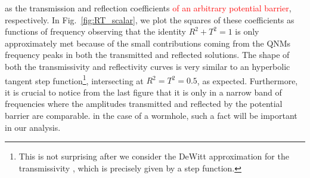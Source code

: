 \documentclass[article,aps,nofootinbib,twocolumn,superscriptaddress]{revtex4-1}
\begin{document}
as the transmission and reflection coefficients \textcolor{red}{of an arbitrary potential barrier}, respectively. In Fig.~\ref{fig:RT_scalar}, we plot the squares of these coefficients as functions of frequency observing that the identity $R^2+T^2=1$ is only approximately met because of the small contributions coming from the QNMs frequency peaks in both the transmitted and reflected solutions. The shape of both the transmissivity and reflectivity curves is very similar to an hyperbolic tangent step function\footnote{This is not surprising after we consider the DeWitt approximation for the transmissivity \citep{DeWitt:1975ys,Frolov:1998wf}, which is precisely given by a step function.}, intersecting at $R^2=T^2=0.5$, as expected. Furthermore, it is crucial to notice from the last figure that it is only in a narrow band of frequencies where the amplitudes transmitted and reflected by the potential barrier are comparable. in the case of a wormhole, such a fact will be important in our analysis.  
\end{document}
